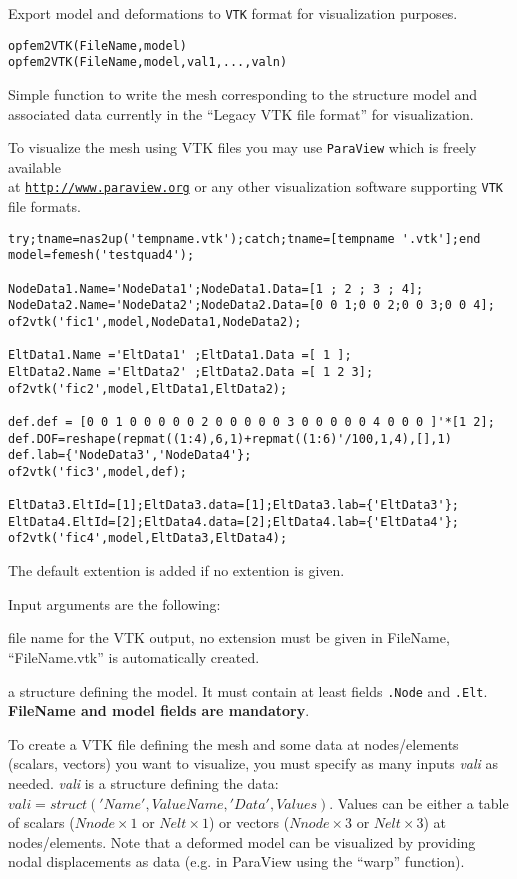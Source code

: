 

Export model and deformations to {\tt VTK} format for visualization purposes.

\rsyntax\begin{verbatim}
opfem2VTK(FileName,model)
opfem2VTK(FileName,model,val1,...,valn)
\end{verbatim}


Simple function to write the mesh corresponding to the structure model and associated data currently in the ``Legacy VTK file format'' for visualization.

To visualize the mesh using VTK files you may use {\tt ParaView} which is freely available\\
at \href{http://www.paraview.org/HTML/Download.html}{\tt http://www.paraview.org} or any other visualization software supporting {\tt VTK} file formats.

\begin{verbatim}
try;tname=nas2up('tempname.vtk');catch;tname=[tempname '.vtk'];end
model=femesh('testquad4');

NodeData1.Name='NodeData1';NodeData1.Data=[1 ; 2 ; 3 ; 4];
NodeData2.Name='NodeData2';NodeData2.Data=[0 0 1;0 0 2;0 0 3;0 0 4];
of2vtk('fic1',model,NodeData1,NodeData2);

EltData1.Name ='EltData1' ;EltData1.Data =[ 1 ];
EltData2.Name ='EltData2' ;EltData2.Data =[ 1 2 3];
of2vtk('fic2',model,EltData1,EltData2);

def.def = [0 0 1 0 0 0 0 0 2 0 0 0 0 0 3 0 0 0 0 0 4 0 0 0 ]'*[1 2]; 
def.DOF=reshape(repmat((1:4),6,1)+repmat((1:6)'/100,1,4),[],1)
def.lab={'NodeData3','NodeData4'};
of2vtk('fic3',model,def);

EltData3.EltId=[1];EltData3.data=[1];EltData3.lab={'EltData3'};
EltData4.EltId=[2];EltData4.data=[2];EltData4.lab={'EltData4'};
of2vtk('fic4',model,EltData3,EltData4);
\end{verbatim}%

The default extention  is added if no extention is given.

Input arguments are the following:

file name for the VTK output, no extension must be given in FileName, ``FileName.vtk'' is automatically created.

a structure defining the model. It must contain at least fields {\tt .Node} and {\tt .Elt}.\\
{\bf FileName and model fields are mandatory}.

To create a VTK file defining the mesh and some data at nodes/elements (scalars, vectors) you want to visualize, you must specify as many inputs \emph{vali} as needed. \emph{vali} is a structure defining the data: {\tt $vali=struct('Name',ValueName,'Data',Values)$}. Values can be either a table of scalars ($Nnode \times 1$ or $Nelt \times 1$) or vectors ($Nnode \times 3$ or $Nelt \times 3$) at nodes/elements.
Note that a deformed model can be visualized by providing nodal displacements as data (e.g. in ParaView using the ``warp'' function).

